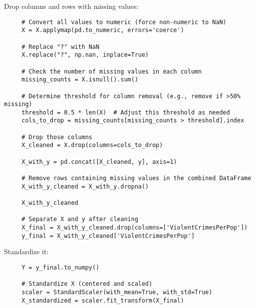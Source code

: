 \documentclass[letterpaper]{article}
\begin{document}
	Drop columns and rows with missing values:
	
	\begin{lstlisting}
     # Convert all values to numeric (force non-numeric to NaN)
     X = X.applymap(pd.to_numeric, errors='coerce')
     
     # Replace "?" with NaN
     X.replace("?", np.nan, inplace=True)
     
     # Check the number of missing values in each column
     missing_counts = X.isnull().sum()
     
     # Determine threshold for column removal (e.g., remove if >50% missing)
     threshold = 0.5 * len(X)  # Adjust this threshold as needed
     cols_to_drop = missing_counts[missing_counts > threshold].index
     
     # Drop those columns
     X_cleaned = X.drop(columns=cols_to_drop)
     
     X_with_y = pd.concat([X_cleaned, y], axis=1)
     
     # Remove rows containing missing values in the combined DataFrame
     X_with_y_cleaned = X_with_y.dropna()
     
     X_with_y_cleaned
     
     # Separate X and y after cleaning
     X_final = X_with_y_cleaned.drop(columns=['ViolentCrimesPerPop'])  
     y_final = X_with_y_cleaned['ViolentCrimesPerPop']
	\end{lstlisting}

  Standardize it:
  
  \begin{lstlisting}
     Y = y_final.to_numpy()
     
     # Standardize X (centered and scaled)
     scaler = StandardScaler(with_mean=True, with_std=True)
     X_standardized = scaler.fit_transform(X_final)
     
  \end{lstlisting}
  
\end{document}
